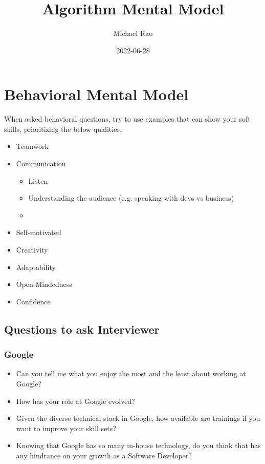 \documentclass{article}
\title{Algorithm Mental Model}
\author{Michael Rao}
\date{2022-06-28}
\begin{document}
\maketitle

\tableofcontents

\newpage

\section{Behavioral Mental Model}

When asked behavioral questions, try to use examples that can show your soft skills, prioritizing the below qualities.

\begin{itemize}
	\item Teamwork
	\item Communication
		\begin{itemize}
			\item Listen
			\item Understanding the audience (e.g. speaking with devs vs business)
			\item 
		\end{itemize}
	\item Self-motivated
	\item Creativity
	\item Adaptability
	\item Open-Mindedness
	\item Confidence
\end{itemize}

\subsection{Questions to ask Interviewer}

\subsubsection{Google}

\begin{itemize}
	\item Can you tell me what you enjoy the most and the least about working at Google?
	\item How has your role at Google evolved?
	\item Given the diverse technical stack in Google, how available are trainings if you want to improve your skill sets?
	\item Knowing that Google has so many in-house technology, do you think that has any hindrance on your growth as a Software Developer?
\end{itemize}
\end{document}
